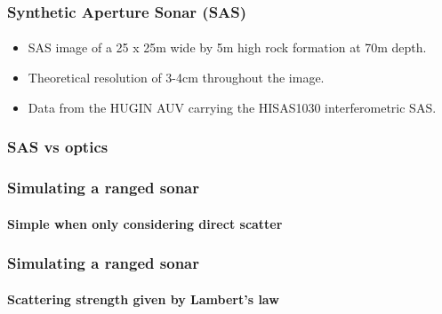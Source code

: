\documentclass[
    beamer                                       %
  ,table,dvipsnames,svgnames
]{common/mytemplate}
\begin{document}
\begin{frame}
\frametitle{\hspace{-.5cm}Synthetic Aperture Sonar (SAS)}
\framesubtitle{}
\vspace{-10pt}
\begin{figure}[H]
\begin{narrow}{.1cm}{-0.6cm}
\flushright\hspace{-10pt}
\end{narrow}
\end{figure}
\vspace{-10pt}
\begin{narrow}{-0.5cm}{-0.5cm}
\begin{itemize}\small
\item SAS image of a 25 x 25m wide by 5m high rock formation at 70m depth.
\item Theoretical resolution of 3-4cm throughout the image.
\item Data from the HUGIN AUV carrying the HISAS1030 interferometric SAS.
\end{itemize}
\end{narrow}
\end{frame}

{
%
\begin{frame}
\frametitle{SAS vs optics}
\framesubtitle{}
\vspace{8cm}
\end{frame}
}

{
%
\begin{frame}
\frametitle{Simulating a ranged sonar}
\framesubtitle{Simple when only considering direct scatter}
\vspace{8cm}
\end{frame}
}


{
%
\begin{frame}
\frametitle{Simulating a ranged sonar}
\framesubtitle{Scattering strength given by Lambert's law}
\vspace{8cm}                                                                                                                                                                                                                                                                                               
\end{frame}
}
\end{document}
